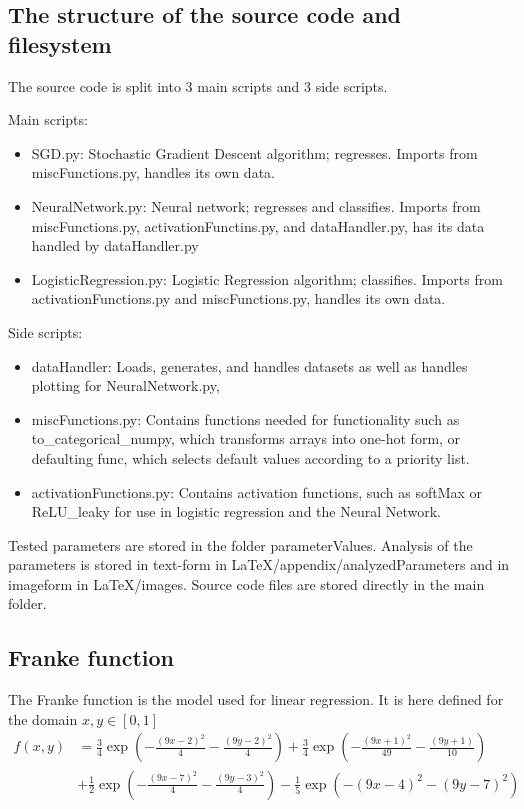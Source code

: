 \documentclass[a4paper, UKenglish]{article}
\newcommand{\0}{\mathbf{0}}
\newcommand{\1}{\mathbf{1}}
\begin{document}
\subsection{The structure of the source code and filesystem}
The source code is split into 3 main scripts and 3 side scripts.

Main scripts:
\begin{itemize}
\item SGD.py: Stochastic Gradient Descent algorithm; regresses. Imports from miscFunctions.py, handles its own data.
\item NeuralNetwork.py: Neural network; regresses and classifies. Imports from miscFunctions.py, activationFunctins.py, and dataHandler.py, has its data handled by dataHandler.py
\item LogisticRegression.py: Logistic Regression algorithm; classifies. Imports from activationFunctions.py and miscFunctions.py, handles its own data.
\end{itemize}

Side scripts:
\begin{itemize}
\item dataHandler: Loads, generates, and handles datasets as well as handles plotting for NeuralNetwork.py, 
\item miscFunctions.py: Contains functions needed for functionality such as to\_categorical\_numpy, which transforms arrays into one-hot form, or defaulting func, which selects default values according to a priority list.
\item activationFunctions.py: Contains activation functions, such as softMax or ReLU\_leaky for use in logistic regression and the Neural Network.
\end{itemize}

Tested parameters are stored in the folder parameterValues. Analysis of the parameters is stored in text-form in LaTeX/appendix/analyzedParameters and in imageform in LaTeX/images. Source code files are stored directly in the main folder.


\subsection{Franke function} \label{sec:Franke}
The Franke function is the model used for linear regression. It is here defined for the domain $x,y \in [0,1]$
\begin{align*}
f(x,y) &= \frac{3}{4}\exp{\left(-\frac{(9x-2)^2}{4} - \frac{(9y-2)^2}{4}\right)}+\frac{3}{4}\exp{\left(-\frac{(9x+1)^2}{49}- \frac{(9y+1)}{10}\right)} \\
&+\frac{1}{2}\exp{\left(-\frac{(9x-7)^2}{4} - \frac{(9y-3)^2}{4}\right)} -\frac{1}{5}\exp{\left(-(9x-4)^2 - (9y-7)^2\right) }
\end{align*}
\end{document}
